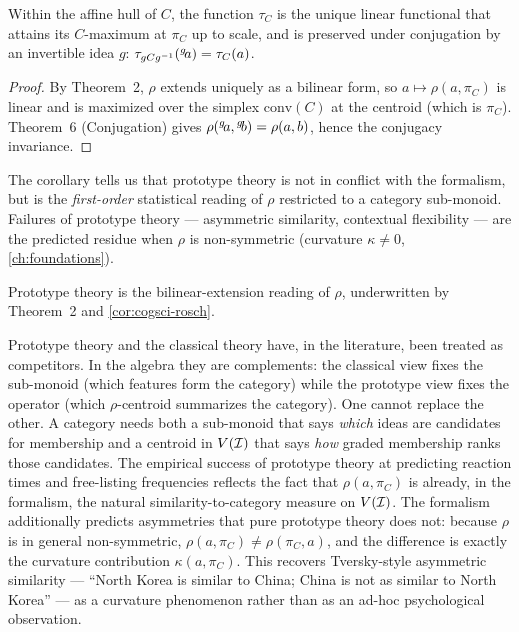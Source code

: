 \begin{corollary}\label{cor:cogsci-rosch}
Within the affine hull of $C$, the function $\tau_C$ is the unique linear
functional that attains its $C$-maximum at $\pi_C$ up to scale, and is
preserved under conjugation by an invertible idea $g$:
$\tau_{gCg^{-1}}({}^{g}\!a)=\tau_C(a)$.
\end{corollary}

\begin{proof}
By Theorem~2, $\rho$ extends uniquely as a bilinear form, so
$a\mapsto\rho(a,\pi_C)$ is linear and is maximized over the simplex
$\mathrm{conv}(C)$ at the centroid (which is $\pi_C$). Theorem~6
(Conjugation) gives $\rho({}^{g}\!a,{}^{g}\!b)=\rho(a,b)$, hence the
conjugacy invariance.
\end{proof}

The corollary tells us that prototype theory is not in conflict with the
formalism, but is the \emph{first-order} statistical reading of $\rho$
restricted to a category sub-monoid. Failures of prototype theory ---
asymmetric similarity, contextual flexibility \citep{Barsalou1983} --- are
the predicted residue when $\rho$ is non-symmetric (curvature $\kappa\ne 0$,
\cref{ch:foundations}).

\formalstatus Prototype theory is the bilinear-extension reading of $\rho$,
underwritten by Theorem~2 and \cref{cor:cogsci-rosch}.

\litcomment Prototype theory and the classical theory have, in the
literature, been treated as competitors. In the algebra they are
complements: the classical view fixes the sub-monoid (which features form
the category) while the prototype view fixes the operator (which
$\rho$-centroid summarizes the category). One cannot replace the other.
A category needs both a sub-monoid that says \emph{which} ideas are
candidates for membership and a centroid in $V(\mathcal{I})$ that says
\emph{how} graded membership ranks those candidates. The empirical
success of prototype theory at predicting reaction times and
free-listing frequencies reflects the fact that $\rho(a,\pi_C)$ is
already, in the formalism, the natural similarity-to-category measure on
$V(\mathcal{I})$. The formalism additionally predicts asymmetries that pure
prototype theory does not: because $\rho$ is in general non-symmetric,
$\rho(a,\pi_C)\ne\rho(\pi_C,a)$, and the difference is exactly the
curvature contribution $\kappa(a,\pi_C)$. This recovers Tversky-style
asymmetric similarity --- ``North Korea is similar to China; China is
not as similar to North Korea'' --- as a curvature phenomenon rather
than as an ad-hoc psychological observation.

